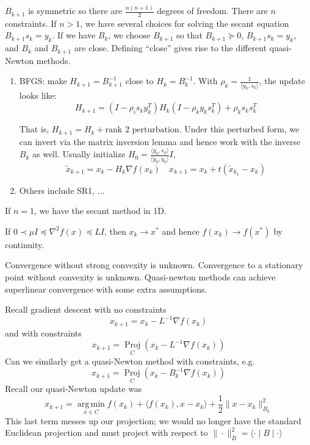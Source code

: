 \documentclass[english, 11pt]{article}
\DeclareMathOperator*{\argmin}{arg\,min}
\begin{document}
\begin{rem}
$B_{k+1}$ is symmetric so there are $\frac{n(n+1)}{2}$ degrees of freedom. There are $n$ constraints. If $n>1$, we have several choices for solving the secant equation $B_{k+1} s_k = y_k$. If we have $B_{k}$, we choose $B_{k+1}$ so that $B_{k+1} \succeq 0$, $B_{k+1} s_k = y_k$, and $B_k$ and $B_{k+1}$ are close. Defining ``close'' gives rise to the different quasi-Newton methods.

\begin{enumerate}
\item BFGS: make $H_{k+1} = B_{k+1}^{-1}$ close to $H_k = B_k^{-1}$. With $\rho_k = \frac{1}{\langle y_k, s_k \rangle}$, the update looks like:
\[
H_{k+1} = (I - \rho_i s_k y_k^T) H_k (I - \rho_k y_k s_k^T) + \rho_k s_k s_k^T
\]

That is, $H_{k+1} = H_k + \text{rank 2 perturbation}$. Under this perturbed form, we can invert via the matrix inversion lemma and hence work with the inverse $B_k$ as well. Usually initialize $H_0 =  \frac{ \langle y_0, s_0 \rangle}{\langle y_0, y_0 \rangle} I$,
\[
\tilde{x}_{k+1} = x_k - H_k \nabla f(x_k) \quad x_{k+1} = x_k + t (\tilde{x}_{k_1} - x_k)
\]

\item Others include  SR1, $\dots$
\end{enumerate}


If $n=1$, we have the secant method in 1D.
\end{rem}

\begin{thrm}
If $0 \prec \mu I \preceq \nabla^2 f(x) \preceq LI$, then $x_k \to x^*$ and hence $f(x_k) \to f(x^*)$ by continuity.
\end{thrm}

\begin{rem}
Convergence without strong convexity is unknown. Convergence to a stationary point without convexity is unknown. Quasi-newton methods can achieve superlinear convergence with some extra assumptions.
\end{rem}

\begin{rem}
Recall gradient descent with no constraints
\[
x_{k+1} = x_k - L^{-1} \nabla f(x_k)
\]
and with constraints
\[
x_{k+1} = \mathop{\mathrm{Proj}} \limits_C \left( x_k - L^{-1} \nabla f(x_k) \right)
\]
Can we similarly get a quasi-Newton method with constraints, e.g.\
\[
x_{k+1} =   \mathop{\mathrm{Proj}} \limits_C \left( x_k - B_k^{-1} \nabla f(x_k) \right)
\]
Recall our quasi-Newton update was
\[
x_{k+1} = \argmin \limits_{x \in C} f(x_k) + \langle f(x_k) , x- x_k \rangle+ \frac{1}{2} \|x-x_k\|_{B_k}^2
\]
This last term messes up our projection; we would no longer have the standard Euclidean projection and must project with respect to $\|\cdot \|_B^2 = \langle \cdot \mid B \mid \cdot \rangle$
\end{rem}
\end{document}
